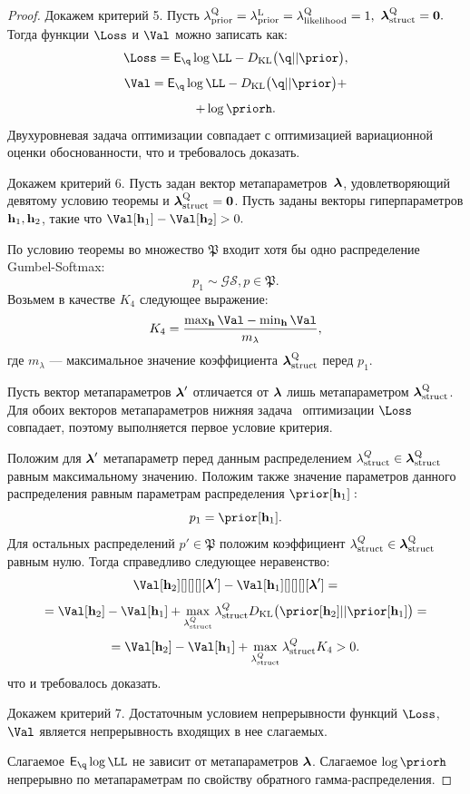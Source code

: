 \begin{proof}
Докажем критерий 5. Пусть $\lambda_\text{prior}^\text{Q} = \lambda_\text{prior}^\text{L} = \lambda_\text{likelihood}^\text{Q} = 1,$ $\boldsymbol{\lambda}_\text{struct}^\text{Q} = \mathbf{0}.$ Тогда функции $\Loss$ и $\Val$  можно записать как: 
$$\Loss = \E_{\q} \log \LL - \KL{\q}{\prior},$$
$$ \Val = \E_{\q} \log \LL - \KL{\q}{\prior}+$$
$$ + \log\priorh.$$
Двухуровневая задача оптимизации совпадает с оптимизацией вариационной оценки обоснованности, что и требовалось доказать.

Докажем критерий 6. 
Пусть задан вектор метапараметров~$\boldsymbol{\lambda}$, удовлетворяющий девятому условию теоремы и $\boldsymbol{\lambda}_\text{struct}^\text{Q} = \mathbf{0}$. Пусть заданы векторы гиперпараметров $\mathbf{h}_1, \mathbf{h}_2$, такие что $\Val[\h_1] - \Val[\h_2]>0.$

По условию теоремы во множество $\mathfrak{P}$ входит хотя бы одно распределение Gumbel-Softmax:
\[
    p_1 \sim \mathcal{GS}, p \in \mathfrak{P}.
\]
Возьмем в качестве $K_4$ следующее выражение:
\[
K_4 = \frac{\max_{\h} \Val - \min_{\h }\Val}{m_{\lambda}},
\]
где $m_{\lambda}$ --- максимальное значение коэффициента $\boldsymbol{\lambda}_\text{struct}^\text{Q}$ перед $p_1$.

Пусть вектор метапараметров $\boldsymbol{\lambda}'$ отличается от $\boldsymbol{\lambda}$ лишь метапараметром $\boldsymbol{\lambda}_\text{struct}^\text{Q}$. Для  обоих векторов метапараметров нижняя задача  оптимизации $\Loss$ совпадает, поэтому выполняется первое условие критерия.


Положим для $\boldsymbol{\lambda}'$ метапараметр перед данным распределением $\lambda^{Q}_\text{struct} \in \boldsymbol{\lambda}_\text{struct}^\text{Q}$ равным максимальному значению. Положим также значение параметров данного распределения равным параметрам распределения $\prior[\h_1]:$
\[
    p_1 = \prior[\h_1].
\]
Для остальных распределений $p' \in \mathfrak{P}$ положим коэффициент $\lambda^{Q}_\text{struct} \in \boldsymbol{\lambda}_\text{struct}^\text{Q}$ равным нулю.  
Тогда справедливо следующее неравенство:
\[
\Val[\h_2][][][][\lam'] - \Val[\h_1][][][][\lam'] = 
\]
\[
=\Val[\h_2]-\Val[\h_1] + \max_{\lambda^{Q}_\text{struct}}\lambda^{Q}_\text{struct} \KL{\prior[\h_2]}{\prior[\h_1]} =
\]
\[
   = \Val[\h_2]-\Val[\h_1] + \max_{\lambda^{Q}_\text{struct}}\lambda^{Q}_\text{struct} K_4 > 0.
\]
что и требовалось доказать.

Докажем критерий 7.
Достаточным условием непрерывности функций $\Loss$, $\Val$ является непрерывность входящих в нее слагаемых. 

Слагаемое $\E_{\q}\log\LL$ не зависит от метапараметров $\boldsymbol{\lambda}$. Слагаемое $\log\priorh$ непрерывно по метапараметрам по свойству обратного гамма-распределения.


\end{proof}
